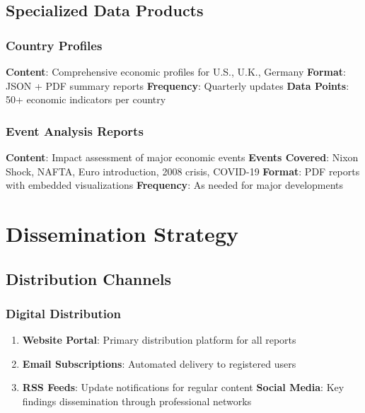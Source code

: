 \documentclass[11pt,a4paper]{article}
\begin{document}
\subsection{Specialized Data Products}

\subsubsection{Country Profiles}
\begin{itemize}
    \textbf{Content}: Comprehensive economic profiles for U.S., U.K., Germany
    \textbf{Format}: JSON + PDF summary reports
    \textbf{Frequency}: Quarterly updates
    \textbf{Data Points}: 50+ economic indicators per country
\end{itemize}

\subsubsection{Event Analysis Reports}
\begin{itemize}
    \textbf{Content}: Impact assessment of major economic events
    \textbf{Events Covered}: Nixon Shock, NAFTA, Euro introduction, 2008 crisis, COVID-19
    \textbf{Format}: PDF reports with embedded visualizations
    \textbf{Frequency}: As needed for major developments
\end{itemize}

\section{Dissemination Strategy}

\subsection{Distribution Channels}

\subsubsection{Digital Distribution}
\begin{enumerate}
    \item \textbf{Website Portal}: Primary distribution platform for all reports
    \item \textbf{Email Subscriptions}: Automated delivery to registered users
    \item \textbf{RSS Feeds}: Update notifications for regular content
    \textbf{Social Media}: Key findings dissemination through professional networks
\end{enumerate}
\end{document}
